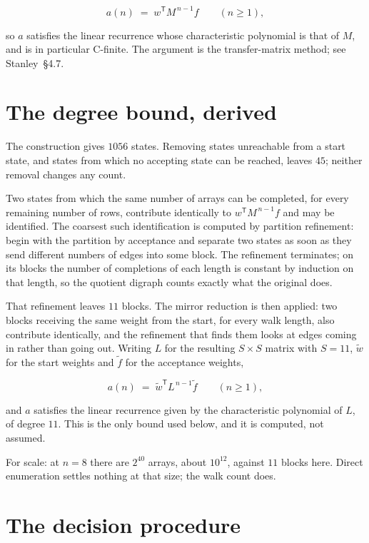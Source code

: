 \documentclass[11pt]{article}
\theoremstyle{definition}
\begin{document}
\[a(n) \;=\; w^{\mathsf T} M^{\,n-1} f \qquad (n \ge 1),\]

so $a$ satisfies the linear recurrence whose characteristic polynomial is that of $M$, and is in particular C-finite. The argument is the transfer-matrix method; see Stanley~\S4.7.

\section{The degree bound, derived}

The construction gives $1056$ states. Removing states unreachable from a start state, and states from which no accepting state can be reached, leaves $45$; neither removal changes any count.

Two states from which the same number of arrays can be completed, for every remaining number of rows, contribute identically to $w^{\mathsf T}M^{\,n-1}f$ and may be identified. The coarsest such identification is computed by partition refinement: begin with the partition by acceptance and separate two states as soon as they send different numbers of edges into some block. The refinement terminates; on its blocks the number of completions of each length is constant by induction on that length, so the quotient digraph counts exactly what the original does.

That refinement leaves $11$ blocks. The mirror reduction is then applied: two blocks receiving the same weight from the start, for every walk length, also contribute identically, and the refinement that finds them looks at edges coming in rather than going out. Writing $L$ for the resulting $S \times S$ matrix with $S = 11$, $\tilde w$ for the start weights and $\tilde f$ for the acceptance weights,

\[a(n) \;=\; \tilde w^{\mathsf T} L^{\,n-1} \tilde f \qquad (n \ge 1),\]

and $a$ satisfies the linear recurrence given by the characteristic polynomial of $L$, of degree $11$. This is the only bound used below, and it is computed, not assumed.

For scale: at $n = 8$ there are $2^{40}$ arrays, about $10^{12}$, against $11$ blocks here. Direct enumeration settles nothing at that size; the walk count does.

\section{The decision procedure}
\end{document}
